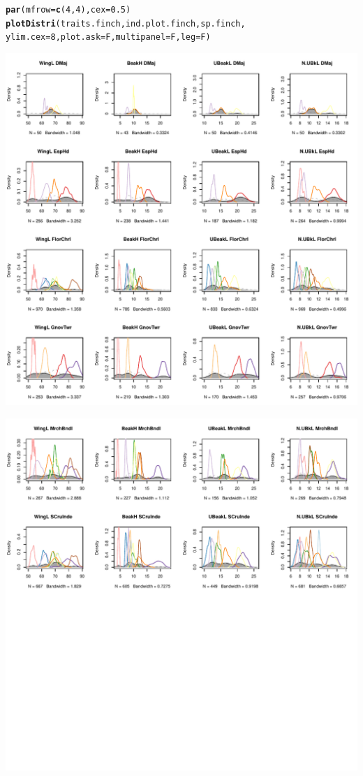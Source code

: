 \documentclass[12pt]{article}\usepackage[]{graphicx}\usepackage[]{color}
\makeatletter
\def\maxwidth{ %
  \ifdim\Gin@nat@width>\linewidth
    \linewidth
  \else
    \Gin@nat@width
  \fi
}
\newcommand{\hlnum}[1]{\textcolor[rgb]{0.686,0.059,0.569}{#1}}%
\newcommand{\hlstd}[1]{\textcolor[rgb]{0.345,0.345,0.345}{#1}}%
\newcommand{\hlkwc}[1]{\textcolor[rgb]{0.333,0.667,0.333}{#1}}%
\newcommand{\hlkwd}[1]{\textcolor[rgb]{0.737,0.353,0.396}{\textbf{#1}}}%
\newenvironment{kframe}{%
 \def\at@end@of@kframe{}%
 \ifinner\ifhmode%
  \def\at@end@of@kframe{\end{minipage}}%
  \begin{minipage}{\columnwidth}%
 \fi\fi%
 \def\FrameCommand##1{\hskip\@totalleftmargin \hskip-\fboxsep
 \colorbox{shadecolor}{##1}\hskip-\fboxsep
     \hskip-\linewidth \hskip-\@totalleftmargin \hskip\columnwidth}%
 \MakeFramed {\advance\hsize-\width
   \@totalleftmargin\z@ \linewidth\hsize
   \@setminipage}}%
 {\par\unskip\endMakeFramed%
 \at@end@of@kframe}
\newenvironment{knitrout}{}{} %
\makeatother
\begin{document}
\begin{knitrout}
\color{fgcolor}\begin{kframe}
\begin{alltt}
\hlkwd{par}\hlstd{(}\hlkwc{mfrow}\hlstd{=}\hlkwd{c}\hlstd{(}\hlnum{4}\hlstd{,}\hlnum{4}\hlstd{),} \hlkwc{cex}\hlstd{=}\hlnum{0.5}\hlstd{)}
\hlkwd{plotDistri}\hlstd{(traits.finch, ind.plot.finch, sp.finch,}
           \hlkwc{ylim.cex}\hlstd{=}\hlnum{8}\hlstd{,} \hlkwc{plot.ask}\hlstd{=F,} \hlkwc{multipanel}\hlstd{=F,} \hlkwc{leg}\hlstd{=F)}
\end{alltt}
\end{kframe}
\includegraphics[width=\maxwidth]{figure/unnamed-chunk-111} 

\includegraphics[width=\maxwidth]{figure/unnamed-chunk-112} 


\end{knitrout}
\end{document}
